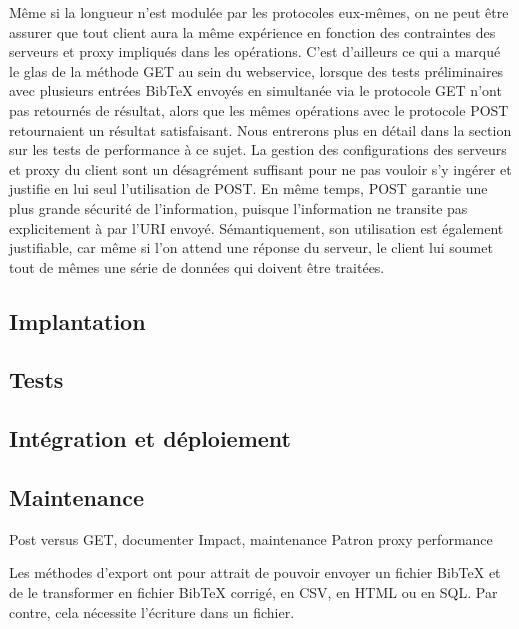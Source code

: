 \documentclass[a4paper,12pt,titlepage]{article}
\begin{document}
Même si la longueur n'est modulée par les protocoles eux-mêmes, on ne peut être assurer que tout client aura la même expérience en fonction des contraintes des serveurs et proxy impliqués dans les opérations. C'est d'ailleurs ce qui a marqué le glas de la méthode GET au sein du webservice, lorsque des tests préliminaires avec plusieurs entrées BibTeX envoyés en simultanée via le protocole GET n'ont pas retournés de résultat, alors que les mêmes opérations avec le protocole POST retournaient un résultat satisfaisant. Nous entrerons plus en détail dans la section sur les tests de performance à ce sujet. La gestion des configurations des serveurs et proxy du client sont un désagrément suffisant pour ne pas vouloir s'y ingérer et justifie en lui seul l'utilisation de POST. En même temps, POST garantie une plus grande sécurité de l'information, puisque l'information ne transite pas explicitement à par l'URI envoyé. Sémantiquement, son utilisation est également justifiable, car même si l'on attend une réponse du serveur, le client lui soumet tout de mêmes une série de données qui doivent être traitées.





\subsection{Implantation}

\subsection{Tests}

\subsection{Intégration et déploiement}

\subsection{Maintenance}

Post versus GET, documenter
Impact, maintenance
Patron proxy
performance


Les méthodes d'export ont pour attrait de pouvoir envoyer un fichier BibTeX et de le transformer en fichier BibTeX corrigé, en CSV, en HTML ou en SQL. Par contre, cela nécessite l'écriture dans un fichier.\newline
\end{document}
